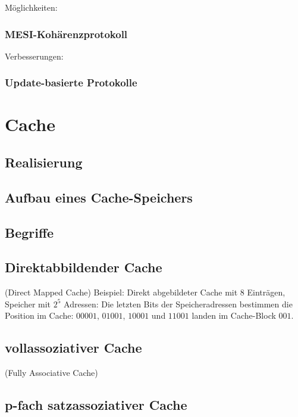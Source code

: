 Möglichkeiten:

\subsubsection*{MESI-Kohärenzprotokoll}
Verbesserungen:

\subsubsection*{Update-basierte Protokolle}

\section{Cache}

\subsection{Realisierung}

\subsection{Aufbau eines Cache-Speichers}

\subsection{Begriffe}

\subsection{Direktabbildender Cache}
(Direct Mapped Cache)
Beispiel: Direkt abgebildeter Cache mit 8 Einträgen, Speicher mit $2^5$ Adressen: Die letzten Bits der Speicheradressen bestimmen die Position im Cache: $00001$, $01001$, $10001$ und $11001$ landen im Cache-Block $001$.

\subsection{vollassoziativer Cache}
(Fully Associative Cache)

\subsection{p-fach satzassoziativer Cache}

